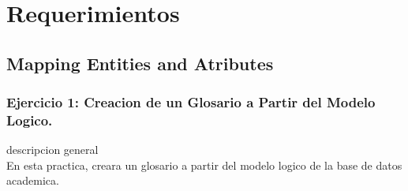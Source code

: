 \documentclass[12pt,letterpaper]{article}
\begin{document}
\section{Requerimientos} 
\subsection{Mapping Entities and Atributes}
\subsubsection{Ejercicio 1: Creacion de un Glosario a Partir del Modelo Logico.} 
descripcion general  \\
En esta practica, creara un glosario a partir del modelo logico de la base de datos academica. \\
\end{document}

